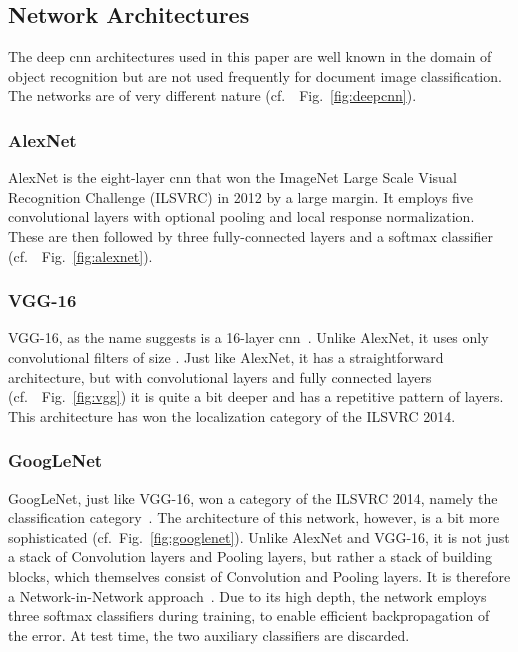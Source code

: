 \documentclass[conference]{IEEEtran}
\newcommand*{\cf}		{cf.\ }
\begin{document}
\subsection{Network Architectures}

The deep \ac{cnn} architectures used in this paper are well known in the domain of object recognition but are not used frequently for document image classification. The networks are of very different nature (\cf~Fig.~\ref{fig:deepcnn}).

\subsubsection{\textbf{AlexNet}}
AlexNet \cite{cnn_alexnet_nips2014} is the eight-layer \ac{cnn} that won the ImageNet Large Scale Visual Recognition Challenge (ILSVRC) in 2012 \cite{russakovsky2015imagenet} by a large margin.
It employs five convolutional layers with optional pooling and local response normalization. These are then followed by three fully-connected layers and a softmax classifier (\cf~Fig.~\ref{fig:alexnet}).

\subsubsection{\textbf{VGG-16}}
VGG-16, as the name suggests is a 16-layer \ac{cnn}~\cite{simonyan2014very}. Unlike AlexNet, it uses only convolutional filters of size . Just like AlexNet, it has a straightforward architecture, but with  convolutional layers and  fully connected layers (\cf~Fig.~\ref{fig:vgg}) it is quite a bit deeper and has a repetitive pattern of layers. This architecture has won the localization category of the ILSVRC 2014.

\subsubsection{\textbf{GoogLeNet}}
GoogLeNet, just like VGG-16, won a category of the ILSVRC 2014, namely the classification category~\cite{szegedy2015going}. The architecture of this network, however, is a bit more sophisticated (\cf Fig.~\ref{fig:googlenet}). Unlike AlexNet and VGG-16, it is not just a stack of Convolution layers and Pooling layers, but rather a stack of building blocks, which themselves consist of Convolution and Pooling layers. It is therefore a Network-in-Network approach~\cite{lin2013network}. Due to its high depth, the network employs three softmax classifiers during training, to enable efficient backpropagation of the error. At test time, the two auxiliary classifiers are discarded.
\end{document}
